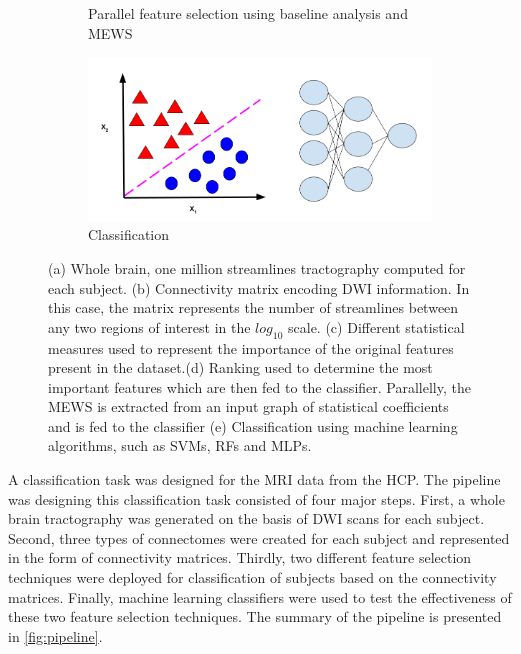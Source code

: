 \documentclass[msthesis.tex]{subfiles}
\begin{document}
\begin{figure}
\begin{subfigure}[b]{0.9\textwidth}
\begin{subfigure}[b]{0.4\textwidth}
         \label{fig:mewspip}
         \end{subfigure}
    \vspace{-2em}
     \caption{Parallel feature selection using baseline analysis and MEWS}
    \end{subfigure}
    \vfill
        \begin{subfigure}[b]{0.6\textwidth}
         \centering
         \includegraphics[height =0.4\textwidth,width=\textwidth]{images/classification.png}
         \caption{Classification}
         \label{fig:three sin x}
         \end{subfigure}
    \caption{(a) Whole brain, one million streamlines tractography computed for each subject. (b) Connectivity matrix encoding DWI information. In this case, the matrix represents the number of streamlines between any two regions of interest in the $log_{10}$ scale. (c) Different statistical measures used to represent the importance of the original features present in the dataset.(d) Ranking used to determine the most important features which are then fed to the classifier. Parallelly, the MEWS is extracted from an input graph of statistical coefficients and is fed to the classifier (e) Classification using machine learning algorithms, such as \gls{SVM}s, \gls{RF}s and \gls{MLP}s.}
    \label{fig:pipeline}
\end{figure}

A classification task was designed for the MRI data from the \gls{HCP}. The pipeline was designing this classification task consisted of four major steps. First, a whole brain tractography was generated on the basis of \gls{DWI} scans for each subject. Second,  three types of connectomes were created for each subject and represented in the form of connectivity matrices. Thirdly, two different feature selection techniques were deployed for classification of subjects based on the connectivity matrices. Finally, machine learning classifiers were used to test the effectiveness of these two feature selection techniques. The summary of the pipeline is presented in \autoref{fig:pipeline}.
\end{document}
